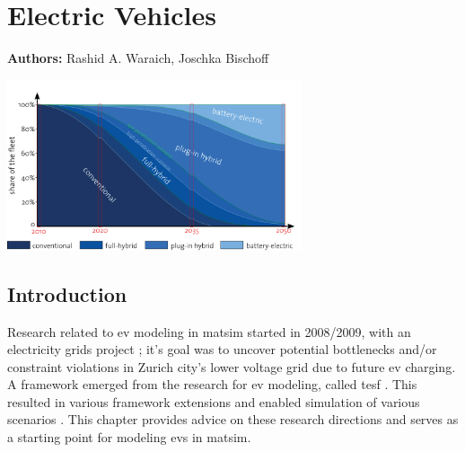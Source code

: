 \chapter{Electric Vehicles}
\label{ch:elvehicles}

\hfill \textbf{Authors:} Rashid A. Waraich, Joschka Bischoff

\begin{center} \includegraphics[width=0.65\textwidth, angle=0]{extending/figures/Elvehicles/main.png} \end{center}



\section{Introduction}
Research related to \gls{ev} modeling in \gls{matsim} started in 2008/2009, with an electricity grids project \citep[][]{WaraichEtAl_IATBR_2009, WaraichEtAl_TRR_2013}; it's goal was to uncover potential bottlenecks and/or constraint violations in Zurich city's lower voltage grid due to future \gls{ev} charging. A framework emerged from the research for \gls{ev} modeling, called \gls{tesf} \citep[][]{WaraichEtAl_JanssensEtAl_2014}. This resulted in various framework extensions and enabled simulation of various scenarios \citep[][]{WaraichEtAl_JanssensEtAl_2014, Waraich_PhDThesis_2014, AbedinWaraich_JSDEWES_2014, Schieffer_MastersThesis_2011, GalusAndersson_CIGRE_2011, GalusEtAl_ResRep_EWZ_2012, Bischoff2013MaTaxis, BischoffMaciejewskiEcabMielecMobilTUM}. This chapter provides advice on these research directions and serves as a starting point for modeling \glspl{ev} in \gls{matsim}.

